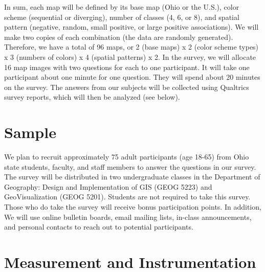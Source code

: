 
In sum, each map will be defined by its base map (Ohio or the U.S.), color scheme (sequential or diverging), number of classes (4, 6, or 8), and spatial pattern (negative, random, small positive, or large positive associations). We will make two copies of each combination (the data are randomly generated). Therefore, we have a total of 96 maps, or 2 (base maps) x 2 (color scheme types) x 3 (numbers of colors) x 4 (spatial patterns) x 2. In the survey, we will allocate 16 map images with two questions for each to one participant. It will take one participant about one minute for one question. They will spend about 20 minutes on the survey. The answers from our subjects will be collected using Qualtrics survey reports, which will then be analyzed (see below).


\section{Sample}

We plan to recruit approximately 75 adult participants (age 18-65) from Ohio state students, faculty, and staff members to answer the questions in our survey. The survey will be distributed in two undergraduate classes in the Department of Geography: Design and Implementation of GIS (GEOG 5223) and GeoVisualization (GEOG 5201). Students are not required to take this survey. Those who do take the survey will receive bonus participation points. In addition, We will use online bulletin boards, email mailing lists, in-class announcements, and personal contacts to reach out to potential participants. 

\section{Measurement and Instrumentation}


